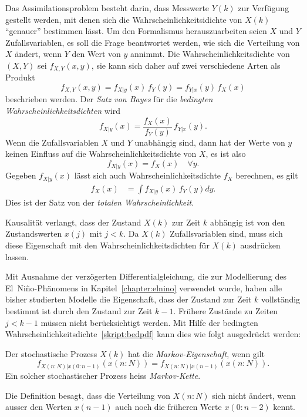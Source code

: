 Das Assimilationsproblem besteht darin, dass Messwerte $Y(k)$ zur Verfügung
gestellt werden, mit denen sich die Wahrscheinlichkeitsidichte von $X(k)$
``genauer'' bestimmen lässt.
Um den Formalismus herauszuarbeiten seien $X$ und $Y$ Zufallsvariablen,
es soll die Frage beantwortet werden, wie sich die Verteilung von $X$
ändert, wenn $Y$ den Wert von $y$  annimmt.
Die Wahrscheinlichkeitsdichte von $(X,Y)$ sei $f_{X,Y}(x,y)$, sie kann
sich daher auf zwei verschiedene Arten als Produkt
\begin{equation}
f_{X,Y}(x,y)
= 
f_{X|y}(x)\,f_Y(y)
=
f_{Y|x}(y)\,f_X(x)
\label{skript:bedpdf}
\end{equation}
beschrieben werden.
%
Der {\em Satz von Bayes} für die {\em bedingten Wahrscheinlichkeitsdichten}
wird 
\begin{equation}
f_{X|y}(x)
=
\frac{f_X(x)}{f_Y(y)}\,f_{Y|x}(y).
\label{assim:bayes}
\end{equation}
Wenn die Zufallsvariablen $X$ und $Y$ unabhängig sind, dann hat der
Werte von $y$ keinen Einfluss auf die Wahrscheinlichkeitsdichte von $X$,
es ist also
\[
f_{X|y}(x)
=
f_X(x)\quad\forall y.
\]
Gegeben $f_{X|y}(x)$ lässt sich auch Wahrscheinlichkeitsdichte
$f_X$ berechnen, es gilt
\begin{align}
f_X(x)
&=
\int f_{X|y}(x)\,f_Y(y) dy.
\label{assim:total}
\end{align}
Dies ist der Satz von der {\em totalen Wahrscheinlichkeit}.
%

Kausalität verlangt, dass der Zustand $X(k)$ zur Zeit $k$ abhängig ist
von den Zustandswerten $x(j)$ mit $j<k$.
Da $X(k)$ Zufallsvariablen sind, muss sich diese Eigenschaft mit den
Wahrscheinlichkeitsdichten für $X(k)$ ausdrücken lassen.

Mit Ausnahme der verzögerten Differentialgleichung, die zur Modellierung
des El~Niño-Phänomens in Kapitel~\ref{chapter:elnino} verwendet wurde,
haben alle bisher studierten Modelle die Eigenschaft, dass der Zustand
zur Zeit $k$ vollständig bestimmt ist durch den Zustand zur Zeit $k-1$.
Frühere Zustände zu Zeiten $j < k-1$ müssen nicht berücksichtigt werden.
Mit Hilfe der bedingten Wahrscheinlichkeitsdichte~\eqref{skript:bedpdf}
kann dies wie folgt ausgedrückt werden:

\begin{definition}
%
%
Der stochastische Prozess $X(k)$ hat die {\em Markov-Eigenschaft}, wenn gilt
\begin{equation}
f_{X(n:N)|x(0:n-1)}(x(n:N)) 
=
f_{X(n:N)|x(n-1)}(x(n:N)).
\end{equation}
Ein solcher stochastischer Prozess heiss {\em Markov-Kette}.
\end{definition}
Die Definition besagt, dass die Verteilung von $X(n:N)$ sich nicht
ändert, wenn ausser den Werten $x(n-1)$ auch noch die früheren
Werte $x(0:n-2)$ kennt.

